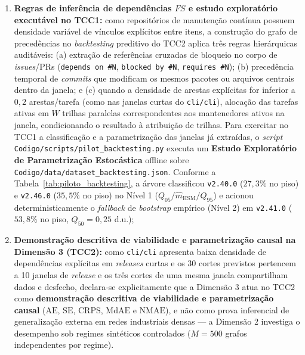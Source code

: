 \documentclass[12pt,openany,oneside,a4paper,english,brazilian,sumario=tradicional]{abntex2}
\begin{document}
\begin{enumerate}
  \item \textbf{Regras de inferência de dependências $FS$ e estudo exploratório executável no TCC1:} como repositórios de manutenção contínua possuem densidade variável de vínculos explícitos entre itens, a construção do grafo de precedências no \textit{backtesting} preditivo do TCC2 aplica três regras hierárquicas auditáveis: (a) extração de referências cruzadas de bloqueio no corpo de \textit{issues}/PRs (\texttt{depends on \#N}, \texttt{blocked by \#N}, \texttt{requires \#N}); (b) precedência temporal de \textit{commits} que modificam os mesmos pacotes ou arquivos centrais dentro da janela; e (c) quando a densidade de arestas explícitas for inferior a $0{,}2$ arestas/tarefa (como nas janelas curtas do \texttt{cli/\allowbreak cli}), alocação das tarefas ativas em $W$ trilhas paralelas correspondentes aos mantenedores ativos na janela, condicionando o resultado à atribuição de trilhas. Para exercitar no TCC1 a classificação e a parametrização das janelas já extraídas, o \textit{script} \texttt{Codigo/\allowbreak scripts/\allowbreak }\allowbreak\texttt{pilot\_\allowbreak backtesting.py} executa um \textbf{Estudo Exploratório de Parametrização Estocástica} offline sobre \texttt{Codigo/\allowbreak data/\allowbreak }\allowbreak\texttt{dataset\_\allowbreak backtesting.json}. Conforme a Tabela~\ref{tab:piloto_backtesting}, a árvore classificou \texttt{v2.40.0} ($27{,}3\%$ no piso) e \texttt{v2.46.0} ($35{,}5\%$ no piso) no Nível 1 ($Q_{05}/\hat{m}_{\mathrm{HSM}}/Q_{95}$) e acionou deterministicamente o \textit{fallback} de \textit{bootstrap} empírico (Nível 2) em \texttt{v2.41.0} ($53{,}8\%$ no piso, $Q_{50}=0{,}25$ d.u.);
  \item \textbf{Demonstração descritiva de viabilidade e parametrização causal na Dimensão 3 (TCC2):} como \texttt{cli/\allowbreak cli} apresenta baixa densidade de dependências explícitas em \textit{releases} curtas e os 30 cortes previstos pertencem a 10 janelas de \textit{release} e os três cortes de uma mesma janela compartilham dados e desfecho, declara-se explicitamente que a Dimensão 3 atua no TCC2 como \textbf{demonstração descritiva de viabilidade e parametrização causal} ($\mathrm{AE}$, $\mathrm{SE}$, $\mathrm{CRPS}$, $\mathrm{MdAE}$ e $\mathrm{NMAE}$), e não como prova inferencial de generalização externa em redes industriais densas --- a Dimensão 2 investiga o desempenho sob regimes sintéticos controlados ($M=500$ grafos independentes por regime).
\end{enumerate}
\end{document}
